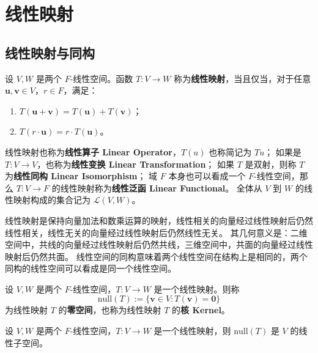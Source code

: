 \section{线性映射}

\subsection{线性映射与同构}

\begin{definition}
    设 $V,W$ 是两个 $F$-线性空间。函数 $T:V\to W$ 称为\textbf{线性映射}，当且仅当，对于任意 $ \mathbf{u},\mathbf{v}\in V $，$ r\in F $，满足：
    \begin{enumerate}
        \item $ T(\mathbf{u}+\mathbf{v}) = T(\mathbf{u}) + T(\mathbf{v}) $；
        \item $ T(r\cdot \mathbf{u}) = r\cdot T(\mathbf{u}) $。
    \end{enumerate}
    线性映射也称为\textbf{线性算子 Linear Operator}，$T(u)$ 也称简记为 $Tu$；
    如果是 $T:V\to V$，也称为\textbf{线性变换 Linear Transformation}；
    如果 $T$ 是双射，则称 $T$ 为\textbf{线性同构 Linear Isomorphism}；
    域 $F$ 本身也可以看成一个 $F$-线性空间，那么 $T:V\to F$ 的线性映射称为\textbf{线性泛函 Linear Functional}。
    全体从 $V$ 到 $W$ 的线性映射构成的集合记为 $\mathcal{L}(V,W)$。
    \label{def:linear_map}
\end{definition}

\begin{note}
    线性映射是保持向量加法和数乘运算的映射，线性相关的向量经过线性映射后仍然线性相关，线性无关的向量经过线性映射后仍然线性无关。
    其几何意义是：二维空间中，共线的向量经过线性映射后仍然共线，三维空间中，共面的向量经过线性映射后仍然共面。
    线性空间的同构意味着两个线性空间在结构上是相同的，两个同构的线性空间可以看成是同一个线性空间。
\end{note}

\vspace{0.5em}

\begin{definition}
    设 $V,W$ 是两个 $F$-线性空间，$T:V\to W$ 是一个线性映射。则称
    \[
        \mathrm{null}(T) := \{\mathbf{v}\in V : T(\mathbf{v}) = \mathbf{0}\}
    \]
    为线性映射 $T$ 的\textbf{零空间}，也称为线性映射 $T$ 的\textbf{核 Kernel}。
    \label{def:linear_map_zero_space}
\end{definition}

\begin{proposition}[线性映射的零空间是线性子空间]
    设 $V,W$ 是两个 $F$-线性空间，$T:V\to W$ 是一个线性映射，则 $\mathrm{null}(T)$ 是 $V$ 的线性子空间。
\end{proposition}

